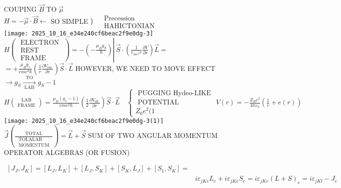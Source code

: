 COUPING $\vec{B}$ TO $\vec{\mu}$\\
$H=-\vec{\mu} \cdot \vec{B} \leftarrow$ SO SIMPLE $\} \begin{aligned} & \text { Precession } \\ & \text { HAHICTONIAN }\end{aligned}$\\
\texttt{[image: 2025\_10\_16\_e34e240cf6beac2f9e0dg-3]}\\
$\left.H\left(\begin{array}{c}\text { ELECTRON } \\ \text { REST } \\ \text { FRAME }\end{array}\right)=-\left(-\frac{\mu_{B} g_{S}}{\hbar}\right) \right\rvert\, \vec{S} \cdot\left(\frac{1}{e_{m c^{2}} r} \frac{\partial V}{\partial r}\right) \vec{L}=$\\
$=+\frac{\mu_{B} g_{s}}{e m c^{2} \hbar}\left(\frac{1}{r} \frac{\partial V_{\text {ess }}}{\partial r}\right) \vec{S} \cdot \vec{L}$ HOWEVER, WE NEED TO MOVE EFFECT $\rightarrow g_{S} \xrightarrow[\text { LAB }]{\text { TO }} g_{S}-1$\\
$H\binom{\text { LAB }}{\text { FRAME }}=\frac{\mu_{B}\left(g_{s}-1\right)}{e m c^{2} \hbar}\left(\frac{1}{2} \frac{\partial V_{\text {eff }}}{\partial r}\right) \vec{S} \cdot \vec{L} \quad\left\{\begin{array}{c}\text { PUGGING Hydeo-LIKE } \\ \text { POTENTIAL } \\ Z_{0} e^{2}(1\end{array}\right. V(r)=-\frac{Z_{R} e^{2}}{4 \pi \varepsilon_{0}}\left(\frac{1}{r}+e(r)\right)$\\
\texttt{[image: 2025\_10\_16\_e34e240cf6beac2f9e0dg-3(1)]}\\
$\vec{J}\left(\frac{\text { TOTAL }}{\begin{array}{l}\text { TOLALAR } \\ \text { MOMENTUM }\end{array}}\right)=\vec{L}+\vec{S}$ SUM OF TWO ANGULAR MOMENTUM OPERATOR ALGEBRAS (OR FUSION)

$$
\begin{aligned}
{\left[J_{J}, J_{K}\right]=\left[L_{J}, L_{K}\right]+\left[L_{J}, S_{K}\right]+\left[S_{K}, L_{J}\right]+\left[S_{1}, S_{K}\right]=} & \\
& i \varepsilon_{j K e} L_{e}+i \varepsilon_{jKe} S_{e}=i \varepsilon_{jKe}(L+S)_{e}=i \varepsilon_{jKl}-J_{e}
\end{aligned}
$$

